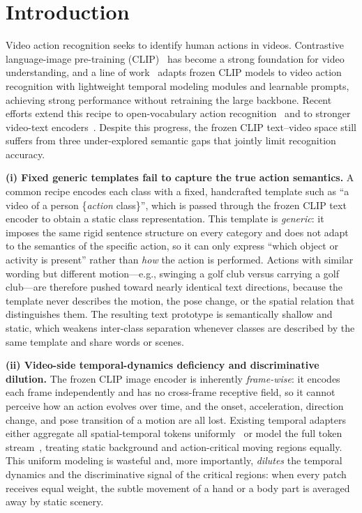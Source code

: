 \section{Introduction}
\label{sec:intro}

Video action recognition seeks to identify human actions in videos.
Contrastive language-image pre-training (CLIP)~\cite{radford2021clip} has become a strong foundation for video understanding, and a line of work~\cite{wang2022actionclip,ni2022xclip,wasim2023vitaclip,wang2024m2clip} adapts frozen CLIP models to video action recognition with lightweight temporal modeling modules and learnable prompts, achieving strong performance without retraining the large backbone. Recent efforts extend this recipe to open-vocabulary action recognition~\cite{ju2024froster} and to stronger video-text encoders~\cite{wang2023internvideo,zhm2025siglip2}.
Despite this progress, the frozen CLIP text--video space still suffers from three under-explored semantic gaps that jointly limit recognition accuracy.

\textbf{(i) Fixed generic templates fail to capture the true action semantics.}
A common recipe encodes each class with a fixed, handcrafted template such as ``a video of a person \{\emph{action} class\}'', which is passed through the frozen CLIP text encoder to obtain a static class representation.
This template is \emph{generic}: it imposes the same rigid sentence structure on every category and does not adapt to the semantics of the specific action, so it can only express ``which object or activity is present'' rather than \emph{how} the action is performed.
Actions with similar wording but different motion---e.g., swinging a golf club versus carrying a golf club---are therefore pushed toward nearly identical text directions, because the template never describes the motion, the pose change, or the spatial relation that distinguishes them.
The resulting text prototype is semantically shallow and static, which weakens inter-class separation whenever classes are described by the same template and share words or scenes.

\textbf{(ii) Video-side temporal-dynamics deficiency and discriminative dilution.}
The frozen CLIP image encoder is inherently \emph{frame-wise}: it encodes each frame independently and has no cross-frame receptive field, so it cannot perceive how an action evolves over time, and the onset, acceleration, direction change, and pose transition of a motion are all lost.
Existing temporal adapters either aggregate all spatial-temporal tokens uniformly~\cite{wasim2023vitaclip} or model the full token stream~\cite{li2024video,liu2024video_mamba}, treating static background and action-critical moving regions equally.
This uniform modeling is wasteful and, more importantly, \emph{dilutes} the temporal dynamics and the discriminative signal of the critical regions: when every patch receives equal weight, the subtle movement of a hand or a body part is averaged away by static scenery.

